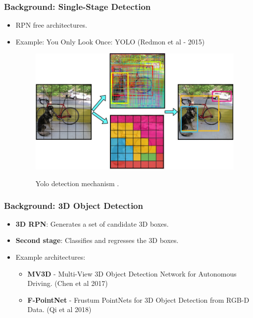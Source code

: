 \documentclass[10pt,fleqn,unknownkeysallowed]{beamer}
\begin{document}
\begin{frame}
	\frametitle{Background: Single-Stage Detection}
	\begin{itemize}
		\item{RPN free architectures.}
		\item{Example: You Only Look Once: YOLO (Redmon et al - 2015)}
		\begin{figure}
			\begin{center}
				\includegraphics[width=0.8\linewidth]{images/yolo_concept} \\
				\caption{Yolo detection mechanism \cite{redmon2016you}.}
			\end{center}
		\end{figure}
	\end{itemize}
\end{frame}


\begin{frame}
	\frametitle{Background: 3D Object Detection}
	\linespread{1.5}
	\begin{itemize}
		\item{\textbf{3D RPN}: Generates a set of candidate 3D boxes.}
		\item{\textbf{Second stage}: Classifies and regresses the 3D boxes.}
		\item{Example architectures:}
		\begin{itemize}
			\item{\textbf{MV3D} - Multi-View 3D Object Detection Network for Autonomous Driving. (Chen et al 2017) \cite{mv3d}}
			\item{\textbf{F-PointNet} - Frustum PointNets for 3D Object Detection from RGB-D Data. (Qi et al 2018) \cite{frustumpointnet}}
		\end{itemize}
	\end{itemize}
\end{frame}
\end{document}
